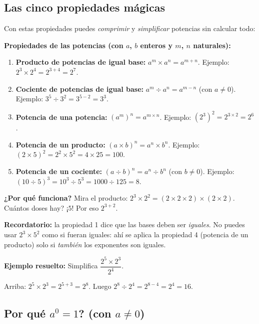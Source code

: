 \documentclass[12pt, letterpaper]{article}
\begin{document}
\subsection{Las cinco propiedades mágicas}

Con estas propiedades puedes \emph{comprimir} y \emph{simplificar} potencias sin calcular todo:

\begin{cuadroteoria}
  \textbf{Propiedades de las potencias (con $a$, $b$ enteros y $m$, $n$ naturales):}
  \begin{enumerate}
    \item \textbf{Producto de potencias de igual base:} $a^m \times a^n = a^{m+n}$. \quad Ejemplo: $2^3 \times 2^4 = 2^{3+4} = 2^7$.
    \item \textbf{Cociente de potencias de igual base:} $a^m \div a^n = a^{m-n}$ (con $a \neq 0$). \quad Ejemplo: $3^5 \div 3^2 = 3^{5-2} = 3^3$.
    \item \textbf{Potencia de una potencia:} $(a^m)^n = a^{m \times n}$. \quad Ejemplo: $(2^3)^2 = 2^{3 \times 2} = 2^6$.
    \item \textbf{Potencia de un producto:} $(a \times b)^n = a^n \times b^n$. \quad Ejemplo: $(2 \times 5)^2 = 2^2 \times 5^2 = 4 \times 25 = 100$.
    \item \textbf{Potencia de un cociente:} $(a \div b)^n = a^n \div b^n$ (con $b \neq 0$). \quad Ejemplo: $(10 \div 5)^3 = 10^3 \div 5^3 = 1000 \div 125 = 8$.
  \end{enumerate}
\end{cuadroteoria}

\noindent\textbf{¿Por qué funciona?} Mira el producto: $2^3 \times 2^2 = (2 \times 2 \times 2) \times (2 \times 2)$. \textquestiondown Cuántos doses hay? ¡$5$! Por eso $2^{3+2}$.

\begin{cuadroadvertencia}
  \textbf{Recordatorio:} la propiedad 1 dice que las bases deben ser \emph{iguales}. No puedes usar $2^3 \times 5^2$ como si fueran iguales: ahí se aplica la propiedad 4 (potencia de un producto) solo si \emph{también} los exponentes son iguales.
\end{cuadroadvertencia}

\noindent\textbf{Ejemplo resuelto:} Simplifica $\dfrac{2^5 \times 2^3}{2^4}$.

Arriba: $2^5 \times 2^3 = 2^{5+3} = 2^8$. Luego $2^8 \div 2^4 = 2^{8-4} = 2^4 = 16$.

\subsection{\textquestiondown Por qué $a^0 = 1$? (con $a \neq 0$)}
\end{document}
